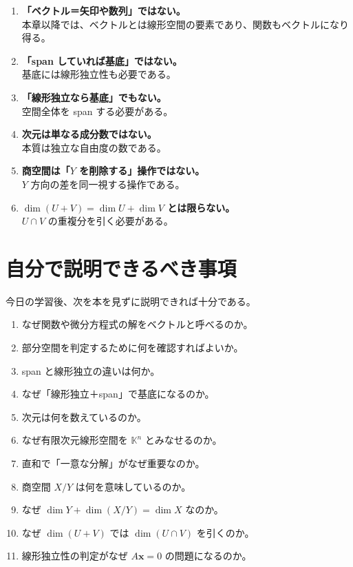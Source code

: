 \documentclass[a4paper,11pt]{ltjsarticle}
\newcommand{\K}{\mathbb{K}}
\begin{document}
\begin{enumerate}
  \item \textbf{「ベクトル＝矢印や数列」ではない。}\\
  本章以降では、ベクトルとは線形空間の要素であり、関数もベクトルになり得る。

  \item \textbf{「span していれば基底」ではない。}\\
  基底には線形独立性も必要である。

  \item \textbf{「線形独立なら基底」でもない。}\\
  空間全体を span する必要がある。

  \item \textbf{次元は単なる成分数ではない。}\\
  本質は独立な自由度の数である。

  \item \textbf{商空間は「$Y$ を削除する」操作ではない。}\\
  $Y$ 方向の差を同一視する操作である。

  \item \textbf{$\dim(U+V)=\dim U+\dim V$ とは限らない。}\\
  $U\cap V$ の重複分を引く必要がある。
\end{enumerate}

\section{自分で説明できるべき事項}

今日の学習後、次を本を見ずに説明できれば十分である。
\begin{enumerate}
  \item なぜ関数や微分方程式の解をベクトルと呼べるのか。
  \item 部分空間を判定するために何を確認すればよいか。
  \item span と線形独立の違いは何か。
  \item なぜ「線形独立＋span」で基底になるのか。
  \item 次元は何を数えているのか。
  \item なぜ有限次元線形空間を $\K^n$ とみなせるのか。
  \item 直和で「一意な分解」がなぜ重要なのか。
  \item 商空間 $X/Y$ は何を意味しているのか。
  \item なぜ $\dim Y+\dim(X/Y)=\dim X$ なのか。
  \item なぜ $\dim(U+V)$ では $\dim(U\cap V)$ を引くのか。
  \item 線形独立性の判定がなぜ $A\bm{x}=0$ の問題になるのか。
\end{enumerate}
\end{document}
